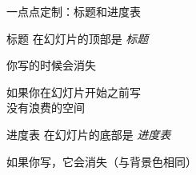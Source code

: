 {

\begin{frame}{一点点定制：标题和进度表}
\begin{block}{标题}
    在幻灯片的顶部是 \emph{标题}
    
    你写的时候会消失
    \begin{itemize}
    \okitem
      如果你在幻灯片开始之前写\\
      没有浪费的空间
    \end{itemize}
\end{block}

\begin{block}{进度表}
    在幻灯片的底部是 \emph{进度表}
    
    如果你写，它会消失（与背景色相同）
  \end{block}

\end{frame}
}

